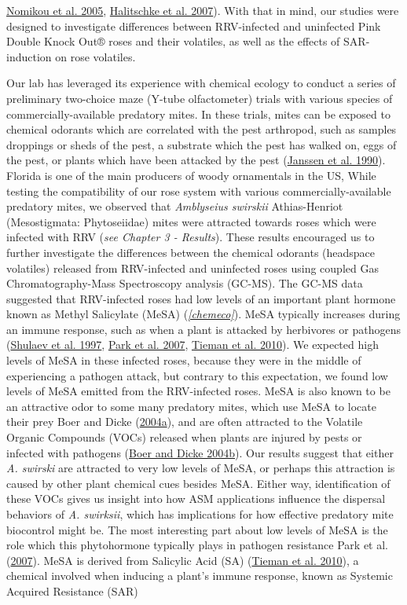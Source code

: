 \documentclass{ufdissertation}[overrideChapters] %
\begin{document}
{\protect\hyperlink{ref-Nomikou2005}{Nomikou et al. 2005}, \protect\hyperlink{ref-Halitschke2007}{Halitschke et al. 2007}). With that in mind, our studies were designed to investigate differences between RRV-infected and uninfected Pink Double Knock Out® roses and their volatiles, as well as the effects of SAR-induction on rose volatiles.

Our lab has leveraged its experience with chemical ecology to conduct a series of preliminary two-choice maze (Y-tube olfactometer) trials with various species of commercially-available predatory mites. In these trials, mites can be exposed to chemical odorants which are correlated with the pest arthropod, such as samples droppings or sheds of the pest, a substrate which the pest has walked on, eggs of the pest, or plants which have been attacked by the pest (\protect\hyperlink{ref-Janssen1990}{Janssen et al. 1990}). Florida is one of the main producers of woody ornamentals in the US, While testing the compatibility of our rose system with various commercially-available predatory mites, we observed that \emph{Amblyseius swirskii} Athias-Henriot (Mesostigmata: Phytoseiidae) mites were attracted towards roses which were infected with RRV (\emph{see Chapter 3 - Results}). These results encouraged us to further investigate the differences between the chemical odorants (headspace volatiles) released from RRV-infected and uninfected roses using coupled Gas Chromatography-Mass Spectroscopy analysis (GC-MS). The GC-MS data suggested that RRV-infected roses had low levels of an important plant hormone known as Methyl Salicylate (MeSA) (\emph{\ref{chemeco}}). MeSA typically increases during an immune response, such as when a plant is attacked by herbivores or pathogens (\protect\hyperlink{ref-Shulaev1997}{Shulaev et al. 1997}, \protect\hyperlink{ref-Park2007}{Park et al. 2007}, \protect\hyperlink{ref-Tieman2010}{Tieman et al. 2010}). We expected high levels of MeSA in these infected roses, because they were in the middle of experiencing a pathogen attack, but contrary to this expectation, we found low levels of MeSA emitted from the RRV-infected roses. MeSA is also known to be an attractive odor to some many predatory mites, which use MeSA to locate their prey Boer and Dicke (\protect\hyperlink{ref-Boer2004a}{2004a}), and are often attracted to the Volatile Organic Compounds (VOCs) released when plants are injured by pests or infected with pathogens (\protect\hyperlink{ref-Boer2004b}{Boer and Dicke 2004b}). Our results suggest that either \emph{A. swirski} are attracted to very low levels of MeSA, or perhaps this attraction is caused by other plant chemical cues besides MeSA. Either way, identification of these VOCs gives us insight into how ASM applications influence the dispersal behaviors of \emph{A. swirksii}, which has implications for how effective predatory mite biocontrol might be. The most interesting part about low levels of MeSA is the role which this phytohormone typically plays in pathogen resistance Park et al. (\protect\hyperlink{ref-Park2007}{2007}). MeSA is derived from Salicylic Acid (SA) (\protect\hyperlink{ref-Tieman2010}{Tieman et al. 2010}), a chemical involved when inducing a plant's immune response, known as Systemic Acquired Resistance (SAR) }
\end{document}
